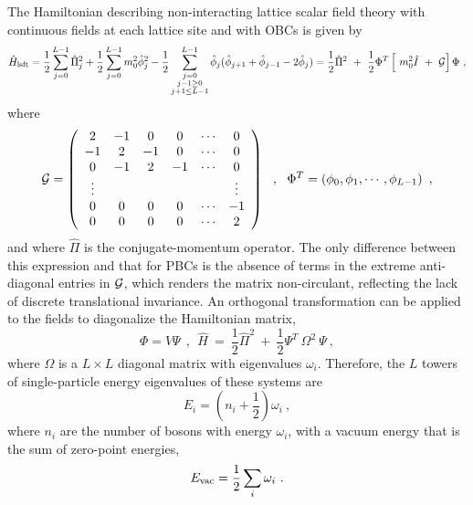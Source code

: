 \documentclass[aps, prc, tightenlines,superscriptaddress, letterpaper, amsmath, amssymb, preprintnumbers, floatfix, longbibliography, nofootinbib]{revtex4-2}
\begin{document}
The Hamiltonian describing non-interacting lattice scalar field theory with continuous fields at each lattice site and with OBCs is given by 
%
\begin{equation}
\hat H_{\rm lsft} = 
\frac{1}{2} \sum_{j=0}^{L-1} \hat \Pi_j^2
+ \frac{1}{2} \sum_{j=0}^{L-1} m_0^2 \hat \phi_j^2
-\frac{1}{2} \sum_{\substack{j=0\\ j-1\ge 0\\ j+1\le L-1}}^{L-1} 
\hat\phi_j (\hat\phi_{j+1}+\hat\phi_{j-1}-2\hat\phi_j)
= 
\frac{1}{2}
\hat \Pi^2 
\ +\ 
\frac{1}{2}
\Phi^T \left[\ 
m_0^2 \hat I
\ +\ 
{\cal G}
\right] \Phi \ ,
    \label{eq:OBC1}
\end{equation}
%
where 
%
\begin{equation}
{\cal G} = 
\left(
\begin{array}{cccccc}
2 & -1 & 0 & 0 & \cdots & 0 \\
-1 & 2 & -1 & 0 & \cdots & 0 \\
0 & -1 & 2 & -1 & \cdots & 0 \\
\vdots & & & & & \vdots \\
0 & 0 & 0 & 0 & \cdots & -1 \\
0 & 0 & 0 & 0 & \cdots & 2 \\
\end{array}
\right)
\ \ ,\ \ 
\Phi^T = \left(\phi_0, \phi_1, \cdots ,\phi_{L-1} \right) \ ,
    \label{eq:OBC2}
\end{equation}
%
and where $\hat\Pi$ is the conjugate-momentum operator.
The only difference between this expression and that for PBCs is the absence of terms in the extreme anti-diagonal entries in ${\cal G}$, which renders the matrix non-circulant, reflecting the lack of discrete translational invariance.
An orthogonal transformation can be applied to the fields to diagonalize the Hamiltonian matrix,
%
\begin{equation}
\Phi = V \Psi
\ \ ,\ \
\hat H \ = \ 
\frac{1}{2}
\hat \Pi^2
\ +\ 
\frac{1}{2}
\Psi^T  
\ 
\Omega^2 \ \Psi 
\ ,
    \label{eq:OBC3}
\end{equation}
%
where $\Omega$ is a $L\times L$ diagonal matrix with eigenvalues $\omega_i$.
Therefore, the $L$ towers of single-particle energy eigenvalues of these systems are 
%
\begin{equation}
E_i = \left(n_i + \frac{1}{2} \right) \omega_i \ ,
    \label{eq:OBC4}
\end{equation}
%
where $n_i$ are the number of bosons with energy $\omega_i$, with a vacuum energy that is the sum of zero-point energies,
%
\begin{equation}
E_{\rm vac} = \frac{1}{2} \sum_i \omega_i \ .
    \label{eq:OBC5}
\end{equation}
%
\end{document}
